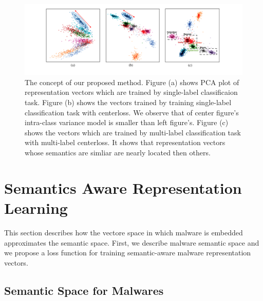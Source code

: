 \begin{figure}[!htb] %
  \includegraphics[width=\textwidth]{../../figures/concept_fix.pdf}
  \caption{The concept of our proposed method. Figure (a) shows PCA plot of representation vectors which are trained by single-label classificaion task. Figure (b) shows the vectors trained by training single-label classification task with centerloss. We observe that of center figure's intra-class variance model is smaller than left figure's.
  Figure (c) shows the vectors which are trained by multi-label classification task with multi-label centerloss. It shows that representation vectors whose semantics are simliar are nearly located then others. 
%  
  }
  \label{fig:concept}
\end{figure}

\section{Semantics Aware Representation Learning}
This section describes how the vectore space in which malware is embedded approximates the semantic space. First, we describe malware semantic space and we propose a loss function for training semantic-aware malware representation vectors.

\subsection{Semantic Space for Malwares}

